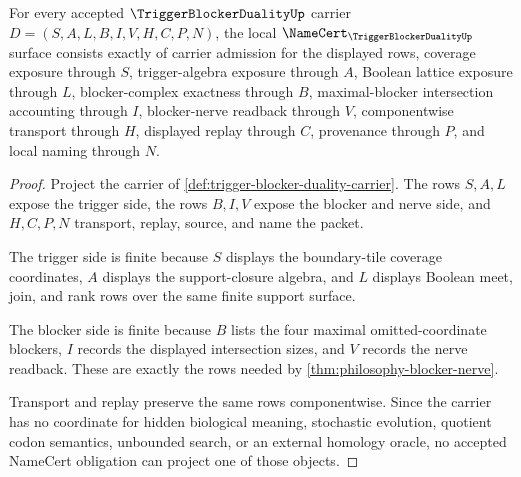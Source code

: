 \begin{theorem}
\label{thm:trigger-blocker-duality-namecert-obligations}
For every accepted $\TriggerBlockerDualityUp$ carrier $D=(S,A,L,B,I,V,H,C,P,N)$, the local $\NameCert_{\TriggerBlockerDualityUp}$ surface consists exactly of carrier admission for the displayed rows, coverage exposure through $S$, trigger-algebra exposure through $A$, Boolean lattice exposure through $L$, blocker-complex exactness through $B$, maximal-blocker intersection accounting through $I$, blocker-nerve readback through $V$, componentwise transport through $H$, displayed replay through $C$, provenance through $P$, and local naming through $N$.
\end{theorem}
\begin{proof}
Project the carrier of \autoref{def:trigger-blocker-duality-carrier}. The rows $S,A,L$ expose the trigger side, the rows $B,I,V$ expose the blocker and nerve side, and $H,C,P,N$ transport, replay, source, and name the packet.

The trigger side is finite because $S$ displays the boundary-tile coverage coordinates, $A$ displays the support-closure algebra, and $L$ displays Boolean meet, join, and rank rows over the same finite support surface.

The blocker side is finite because $B$ lists the four maximal omitted-coordinate blockers, $I$ records the displayed intersection sizes, and $V$ records the nerve readback. These are exactly the rows needed by \autoref{thm:philosophy-blocker-nerve}.

Transport and replay preserve the same rows componentwise. Since the carrier has no coordinate for hidden biological meaning, stochastic evolution, quotient codon semantics, unbounded search, or an external homology oracle, no accepted NameCert obligation can project one of those objects.
\end{proof}

